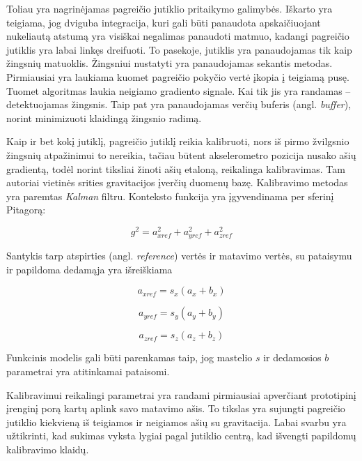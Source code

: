 Toliau yra nagrinėjamas pagreičio jutiklio pritaikymo galimybės. Iškarto yra teigiama, jog dviguba integracija, kuri gali būti panaudota apskaičiuojant nukeliautą atstumą yra visiškai negalimas panaudoti matmuo, kadangi pagreičio jutiklis yra labai linkęs dreifuoti. To pasekoje, jutiklis yra panaudojamas tik kaip žingsnių matuoklis. Žingsniui nustatyti yra panaudojamas sekantis metodas. Pirmiausiai yra laukiama kuomet pagreičio pokyčio vertė įkopia į teigiamą pusę. Tuomet algoritmas laukia neigiamo gradiento signale. Kai tik jis yra randamas -- detektuojamas žingsnis. Taip pat yra panaudojamas verčių buferis (angl. \textit{buffer}), norint minimizuoti klaidingą žingsnio radimą.

Kaip ir bet kokį jutiklį, pagreičio jutiklį reikia kalibruoti, nors iš pirmo žvilgsnio žingsnių atpažinimui to nereikia, tačiau būtent akselerometro pozicija nusako ašių gradientą, todėl norint tiksliai žinoti ašių etaloną, reikalinga kalibravimas. Tam autoriai vietinės srities gravitacijos įverčių duomenų bazę. Kalibravimo metodas yra paremtas \cite{wendel2011integrierte} \textit{Kalman} filtru. Konteksto funkcija yra įgyvendinama per sferinį Pitagorą:

\begin{equation}
    g^2 = a_{xref}^2 + a_{yref}^2 + a_{zref}^2
\end{equation}

Santykis tarp atspirties (angl. \textit{reference}) vertės ir matavimo vertės, su pataisymu ir papildoma dedamąja yra išreiškiama

\begin{equation}
    a_{xref} = s_x (a_x + b_x)
\end{equation}

\begin{equation}
    a_{yref} = s_y (a_y + b_y)
\end{equation}

\begin{equation}
    a_{zref} = s_z (a_z + b_z)
\end{equation}

Funkcinis modelis gali būti parenkamas taip, jog mastelio $s$ ir dedamosios $b$ parametrai yra atitinkamai pataisomi.

Kalibravimui reikalingi parametrai yra randami pirmiausiai apverčiant prototipinį įrenginį porą kartų aplink savo matavimo ašis. To tikslas yra sujungti pagreičio jutiklio kiekvieną iš teigiamos ir neigiamos ašių su gravitacija. Labai svarbu yra užtikrinti, kad sukimas vyksta lygiai pagal jutiklio centrą, kad išvengti papildomų kalibravimo klaidų.

